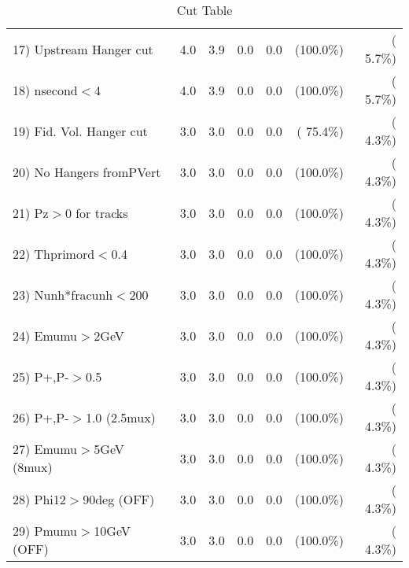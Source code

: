 \begin{table}[h!]
\begin{tabular}{||l||r|r|r|r|r|r||}
 17) Upstream Hanger cut  &          4.0 &          3.9 &          0.0 &          0.0 & (100.0\%) & (  5.7\%) \\
 18) nsecond$<$4          &          4.0 &          3.9 &          0.0 &          0.0 & (100.0\%) & (  5.7\%) \\
 19) Fid. Vol. Hanger cut &          3.0 &          3.0 &          0.0 &          0.0 & ( 75.4\%) & (  4.3\%) \\
 20) No Hangers fromPVert &          3.0 &          3.0 &          0.0 &          0.0 & (100.0\%) & (  4.3\%) \\
 21) Pz$>$0 for tracks    &          3.0 &          3.0 &          0.0 &          0.0 & (100.0\%) & (  4.3\%) \\
 22) Thprimord$<$0.4      &          3.0 &          3.0 &          0.0 &          0.0 & (100.0\%) & (  4.3\%) \\
 23) Nunh*fracunh$<$200   &          3.0 &          3.0 &          0.0 &          0.0 & (100.0\%) & (  4.3\%) \\
 24) Emumu$>$2GeV         &          3.0 &          3.0 &          0.0 &          0.0 & (100.0\%) & (  4.3\%) \\
 25) P+,P-$>$0.5          &          3.0 &          3.0 &          0.0 &          0.0 & (100.0\%) & (  4.3\%) \\
 26) P+,P-$>$1.0 (2.5mux) &          3.0 &          3.0 &          0.0 &          0.0 & (100.0\%) & (  4.3\%) \\
 27) Emumu$>$5GeV  (8mux) &          3.0 &          3.0 &          0.0 &          0.0 & (100.0\%) & (  4.3\%) \\
 28) Phi12$>$90deg  (OFF) &          3.0 &          3.0 &          0.0 &          0.0 & (100.0\%) & (  4.3\%) \\
 29) Pmumu$>$10GeV  (OFF) &          3.0 &          3.0 &          0.0 &          0.0 & (100.0\%) & (  4.3\%) \\
 \hline
 \hline
 \end{tabular}
 \caption{Cut Table           }
 \label{tab-cutcohjpsi-mumu_anuecc}
 \end{table}
